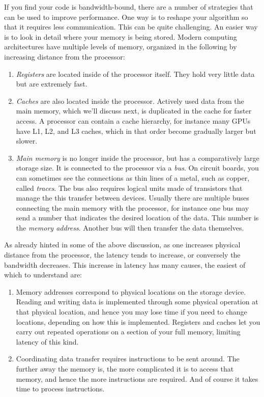 If you find your code is bandwidth-bound, there are a number of strategies that
can be used to improve performance. One way is to reshape your algorithm so that
it requires less communication. This can be quite challenging. An easier way is
to look in detail where your memory is being stored. Modern computing
architectures have multiple levels of memory, organized in the following by
increasing distance from the processor:
\begin{enumerate}
  \item {\it Registers} are located inside of the processor
itself. They hold very little data but are extremely fast.
  \item {\it Caches} are also located inside the processor.
Actively used data from the main memory, which we'll discuss next, is duplicated
in the cache for faster access. A processor can contain a cache hierarchy, for
instance many GPUs have L1, L2, and L3 caches, which in that order become
gradually larger but slower.
  \item {\it Main memory} is no longer inside the processor,
but has a comparatively large storage size. It is connected to the processor
via a {\it bus}. On circuit boards, you can sometimes see the 
connections as thin lines of a metal, such as copper, called {\it
traces}. The bus also requires logical units made of transistors
that manage the this transfer between devices.
Usually there are multiple buses connecting the main
memory with the processor, for instance one bus may send a number that indicates
the desired location of the data. This number is the {\it memory address}.
Another bus will then transfer the data themselves.
\end{enumerate}
As already hinted in some of the above discussion, as one increases physical
distance from the processor, the latency tends to increase, or conversely the
bandwidth decreases. This increase in latency has many causes, the easiest of
which to understand are:
\begin{enumerate}
  \item Memory addresses correspond to physical locations on the storage device.
Reading and writing data is implemented through some physical operation at that
physical location, and hence you may lose time if you need to change locations,
depending on how this is implemented. Registers and caches let you carry out
repeated operations on a section of your full memory, limiting latency of this kind.
  \item Coordinating data transfer requires instructions to be sent around. The
further away the memory is, the more complicated it is to access that memory,
and hence the more instructions are required. And of course it takes time to
process instructions.
\end{enumerate}

